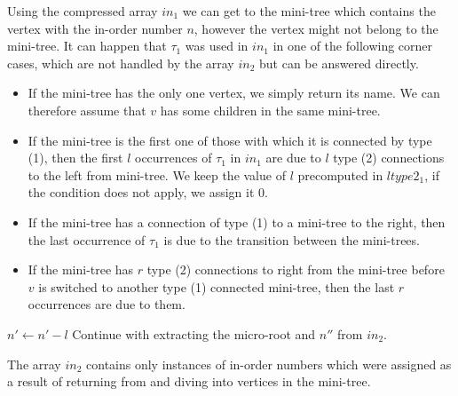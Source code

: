 Using the compressed array $in_1$ we can get to the mini-tree which contains the vertex with the in-order number $n$, however the vertex might not belong to the mini-tree.
It can happen that $\tau_1$ was used in $in_1$ in one of the following corner cases, which are not handled by the array $in_2$ but can be answered directly.
\begin{itemize}
	\item If the mini-tree has the only one vertex, we simply return its name.
	We can therefore assume that $v$ has some children in the same mini-tree.
	\item If the mini-tree is the first one of those with which it is connected by type (1), then the first $l$ occurrences of $\tau_1$ in $in_1$ are due to $l$ type (2) connections to the left from mini-tree.
	We keep the value of $l$ precomputed in $ltype2_1$, if the condition does not apply, we assign it $0$.
	\item If the mini-tree has a connection of type (1) to a mini-tree to the right, then the last occurrence of $\tau_1$ is due to the transition between the mini-trees.
	\item If the mini-tree has $r$ type (2) connections to right from the mini-tree before $v$ is switched to another type (1) connected mini-tree,
	then the last $r$ occurrences are due to them.
\end{itemize}

\begin{algorithmic}
	\State {}
\Else
	\State $n' \gets n' - l$
\EndIf
{}
	\State {}
\Else
	\State Continue with extracting the micro-root and $n''$ from $in_2$.
\EndIf
\end{algorithmic}

The array $in_2$ contains only instances of in-order numbers which were assigned as a result of returning from and diving into vertices in the mini-tree.

